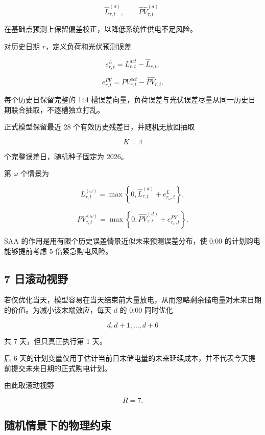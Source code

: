 \[
\hat L_{\tau,t}^{(d)},
\qquad
\widehat{PV}_{\tau,t}^{(d)}.
\]

在基础点预测上保留偏差校正，以降低系统性供电不足风险。

对历史日期 \(r\)，定义负荷和光伏预测误差

\[
e^L_{r,t}
=
L_{r,t}^{act}
-
\hat L_{r,t},
\]

\begin{equation}
e^{PV}_{r,t}
=
PV_{r,t}^{act}
-
\widehat{PV}_{r,t}.
\end{equation}

每个历史日保留完整的 144 槽误差向量，负荷误差与光伏误差尽量从同一历史日期联合抽取，不逐槽独立打乱。

正式模型保留最近 28 个有效历史残差日，并随机无放回抽取

\[
K=4
\]

个完整误差日，随机种子固定为 2026。

第 \(\omega\) 个情景为

\begin{equation}
L_{\tau,t}^{(\omega)}
=
\max
\left\{
0,
\hat L_{\tau,t}^{(d)}
+
e^L_{r_\omega,t}
\right\},
\end{equation}

\begin{equation}
PV_{\tau,t}^{(\omega)}
=
\max
\left\{
0,
\widehat{PV}_{\tau,t}^{(d)}
+
e^{PV}_{r_\omega,t}
\right\}.
\end{equation}

SAA 的作用是用有限个历史误差情景近似未来预测误差分布，使 0:00 的计划购电能够提前考虑 5 倍紧急购电风险。

\subsection{7 日滚动视野}

若仅优化当天，模型容易在当天结束前大量放电，从而忽略剩余储电量对未来日期的价值。为减小该末端效应，每天 \(d\) 的 0:00 同时优化

\[
d,d+1,\ldots,d+6
\]

共 7 天，但只真正执行第 1 天。

后 6 天的计划变量仅用于估计当前日末储电量的未来延续成本，并不代表今天提前提交未来日期的正式购电计划。

由此取滚动视野

\[
R=7.
\]

\subsection{随机情景下的物理约束}

